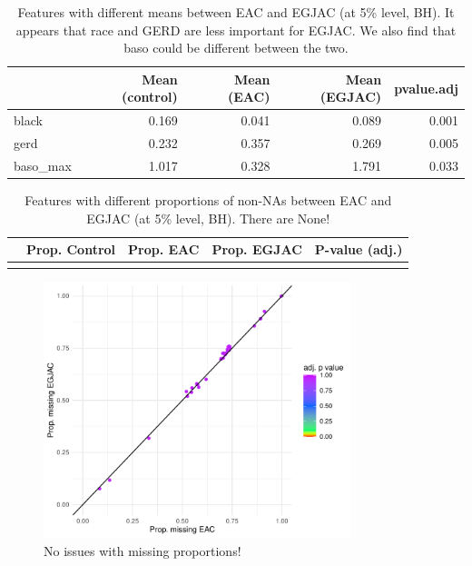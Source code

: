 \documentclass[12pt]{article}
\begin{document}
\begin{table}[ht]
\centering
\begin{tabular}{lrrrr}
\hline
& Mean (control) & Mean (EAC) & Mean (EGJAC) & pvalue.adj \\
\hline
black & 0.169 & 0.041 & 0.089 & 0.001 \\ 
  gerd & 0.232 & 0.357 & 0.269 & 0.005 \\ 
  baso\_max & 1.017 & 0.328 & 1.791 & 0.033 \\ 
\hline
\end{tabular}
\caption{Features with different means between EAC and EGJAC (at 5\% level, BH). It appears that race and GERD are less important for EGJAC. 
We also find that baso could be different between the two.}
\end{table}



\clearpage

\begin{table}[ht]
\centering
\begin{tabular}{lrrrr}
\toprule
& Prop. Control & Prop. EAC & Prop. EGJAC & P-value (adj.) \\ 
\midrule
\\
\bottomrule
\end{tabular}
\caption{Features with different proportions of non-NAs between EAC and EGJAC (at 5\% level, BH).
There are None!}
\end{table}


\begin{figure}[h]
\centering
\includegraphics[width=0.8\textwidth]{figures/eac_v_egjac/vs_propNA.pdf}
\caption{No issues with missing proportions!}
\end{figure}
\end{document}
